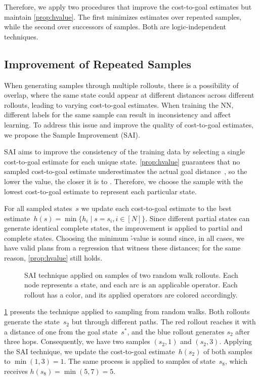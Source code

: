Therefore, we apply two procedures that improve the cost-to-goal estimates but maintain \cref{prop:hvalue}. The first minimizes estimates over repeated samples, while the second over successors of samples. Both are logic-independent techniques.

\subsection{Improvement of Repeated Samples}
\label{sec:sai}

When generating samples through multiple rollouts, there is a possibility of overlap, where the same state could appear at different distances across different rollouts, leading to varying cost-to-goal estimates. When training the NN, different labels for the same sample can result in inconsistency and affect learning. To address this issue and improve the quality of cost-to-goal estimates, we propose the Sample Improvement (SAI).

SAI aims to improve the consistency of the training data by selecting a single cost-to-goal estimate for each unique state. \cref{prop:hvalue} guarantees that no sampled cost-to-goal estimate underestimates the actual goal distance~\hstar, so the lower the value, the closer it is to \hstar. Therefore, we choose the sample with the lowest cost-to-goal estimate to represent each particular state.

For all sampled states~$s$ we update each cost-to-goal estimate to the best estimate~$h(s) = \min\{h_i \mid s=s_i, i\in[N]\}$. Since different partial states can generate identical complete states, the improvement is applied to partial and complete states. Choosing the minimum \h-value is sound since, in all cases, we have valid plans from a regression that witness these distances; for the same reason, \cref{prop:hvalue} still holds.

\begin{figure}[tb]
    \caption[SAI technique applied on samples of random walk rollouts.]{SAI technique applied on samples of two random walk rollouts. Each node represents a state, and each arc is an applicable operator. Each rollout has a color, and its applied operators are colored accordingly.}
    \label{fig:sai}
    \addmargin
    \centering
    
\end{figure}

\cref{fig:sai} presents the technique applied to sampling from random walks. Both rollouts generate the state~$s_2$ but through different paths. The red rollout reaches it with a distance of one from the goal state~$s^*$, and the blue rollout generates $s_2$ after three hops. Consequently, we have two samples $(s_2,1)$ and $(s_2,3)$. Applying the SAI technique, we update the cost-to-goal estimate~$h(s_2)$ of both samples to $\min(1,3)=1$. The same process is applied to samples of state~$s_8$, which receives $h(s_8)=\min(5,7)=5$.

